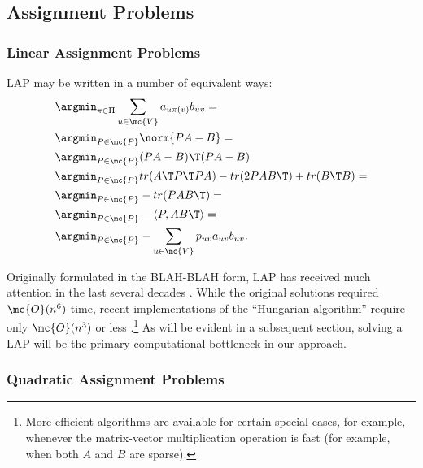 \documentclass[10pt,journal,cspaper,compsoc]{IEEEtran}
\newcommand{\PmcP}{P \in \mc{P}}
\begin{document}
\subsection{Assignment Problems} %
\label{sub:assignment_problems}

\subsubsection{Linear Assignment Problems} %
\label{ssub:linear_assignment_problems}


LAP may be written in a number of equivalent ways:
\begin{align}
	 &\argmin_{\pi \in \Pi} \sum_{u \in \mc{V}} a_{u \pi(v)} b_{uv} =\nonumber\\
	&\argmin_{\PmcP} \norm{PA - B} =\nonumber\\
	&\argmin_{\PmcP} (PA-B)\T (PA-B) \nonumber\\ 
	&\argmin_{\PmcP} tr (A\T P\T PA) - tr(2PAB\T) + tr(B\T B)=\nonumber\\ 
	&\argmin_{\PmcP}  -tr (P AB\T) =\nonumber\\
	&\argmin_{\PmcP}  -\langle P, AB\T \rangle =\nonumber\\
	&\argmin_{\PmcP}  -\sum_{u \in \mc{V}} p_{uv} a_{uv} b_{uv}. \label{eq:LAP}
\end{align}

Originally formulated in the BLAH-BLAH form, LAP has received much attention in the last several decades \cite{???}. While the original solutions required $\mc{O}(n^6)$ time, recent implementations of the ``Hungarian algorithm'' require only $\mc{O}(n^3)$ or less \cite{???}.\footnote{More efficient algorithms are available for certain special cases, for example, whenever the matrix-vector multiplication operation is fast (for example, when both $A$ and $B$ are sparse).} As will be evident in a subsequent section, solving a LAP will be the primary computational bottleneck in our approach.   

\subsubsection{Quadratic Assignment Problems} %
\label{ssub:linear_assignment_problems}

\end{document}
